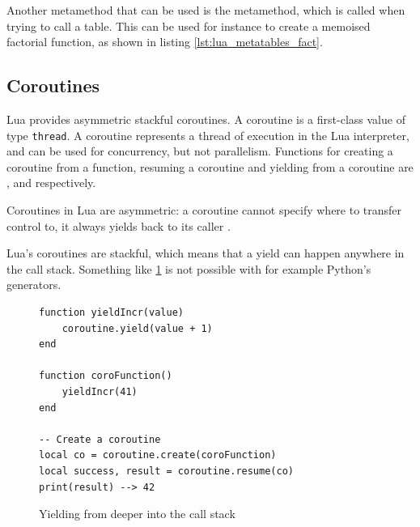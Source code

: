 Another metamethod that can be used is the  metamethod, which is called when trying to call a table. This can be used for instance to create a memoised factorial function, as shown in listing \ref{lst:lua_metatables_fact}.

\subsection{Coroutines}\label{section-lua-coroutines}
Lua provides asymmetric stackful coroutines. A coroutine is a first-class value of type \texttt{thread}. A coroutine represents a thread of execution in the Lua interpreter, and can be used for concurrency, but not parallelism. Functions for creating a coroutine from a function, resuming a coroutine and yielding from a coroutine are ,  and  respectively.

Coroutines in Lua are asymmetric: a coroutine cannot specify where to transfer control to, it always yields back to its caller \cite{moura2009revisiting}.

Lua's coroutines are stackful, which means that a yield can happen anywhere in the call stack. Something like \ref{lst:lua_coroutines} is not possible with for example Python's generators.

\begin{figure}[ht]
\centering
\begin{verbatim}
function yieldIncr(value)
    coroutine.yield(value + 1)
end

function coroFunction()
    yieldIncr(41)
end

-- Create a coroutine
local co = coroutine.create(coroFunction)
local success, result = coroutine.resume(co)
print(result) --> 42
\end{verbatim}
\caption{Yielding from deeper into the call stack}
\label{lst:lua_coroutines}
\end{figure}

